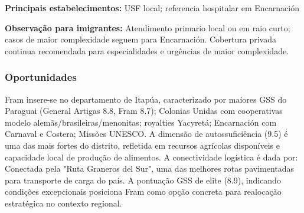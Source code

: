 \textbf{Principais estabelecimentos:} USF local; referencia hospitalar
em Encarnación

\textbf{Observação para imigrantes:} Atendimento primario local ou em
raio curto; casos de maior complexidade seguem para Encarnación.
Cobertura privada continua recomendada para especialidades e urgências
de maior complexidade.
\newpage

\subsubsection*{Oportunidades}\label{oport-fram-0711}
Fram insere-se no departamento de Itapúa, caracterizado por maiores GSS do Paraguai (General Artigas 8.8, Fram 8.7); Colonias Unidas com cooperativas modelo alemãs/brasileiras/menonitas; royalties Yacyretá; Encarnación com Carnaval e Costera; Missões UNESCO. A dimensão de autossuficiência (9.5) é uma das mais fortes do distrito, refletida em recursos agrícolas disponíveis e capacidade local de produção de alimentos. A conectividade logística é dada por: Conectada pela "Ruta Graneros del Sur", uma das melhores rotas pavimentadas para transporte de carga do país. A pontuação GSS de elite (8.9), indicando condições excepcionais posiciona Fram como opção concreta para realocação estratégica no contexto regional.

